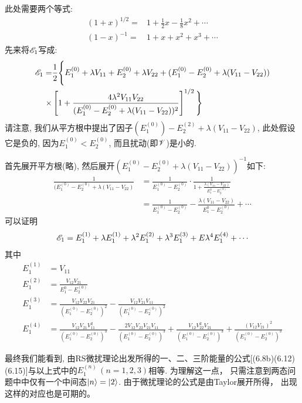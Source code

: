 此处需要两个等式:
\begin{align}
	(1+x)^{1/2} =& 1 + \frac{1}{2} x - \frac{1}{8} x^2 + \cdots\\
	(1-x)^{-1}  =& 1 +x +x^2 +x^3+\cdots
\end{align}
先来将$\mathscr{E}_1$写成:
\begin{align*}
\mathscr{E}_1 = & \frac{1}{2} \Bigg\{ E_1^{(0)} + \lambda V_{11} + E_2^{(0)} + \lambda V_{22} + (E_1^{(0)} -E_2^{(0)} +\lambda(V_{11} - V_{22}) ) \\
\times & \left[1 + \frac{4\lambda^2V_{11}V_{22}}{(E_1^{(0)}  - E_2^{(0)} + \lambda(V_{11}-V_{22}) )^2} \right]^{1/2}
     \Bigg\}
\end{align*}
请注意, 
我们从平方根中提出了因子$(E_1^{(0)}) - E_2^{(2)} +\lambda(V_{11}-V_{22}) $, 
此处假设它是负的, 
因为$E_1^{(0)}<E_2^{(0)}$, 
而且扰动(即$\mathscr{V}$)是小的.


首先展开平方根(略), 
然后展开$(E_1^{(0)}-E_2^{(0)} + \lambda(V_{11}-V_{22}))^{-1}$如下:
\begin{align*}
	\frac{1}{(E_1^{(0)}-E_2^{(0)} + \lambda(V_{11}-V_{22})} & =\frac{1}{E_1^{(0)} - E_2^{(0) }}\cdot \frac{1}{1+\frac{\lambda(V_{11}-V_{22}) }{E_1^{0} -E_2^{(0)} }}\\
		& = \frac{1}{E_1^{(0)} - E_2^{(0)}} - \frac{\lambda(V_{11}-V_{22}) }{E_1^{0} -E_2^{(0)} }+\cdots
\end{align*}
可以证明
\begin{align}
\mathscr{E}_1 = E_1^{(1)} + \lambda E_1^{(1)} + \lambda^2 E_1^{(2)} + \lambda^3 E_1^{(3)} + E\lambda^4 E_1^{(4)} + \cdots
\end{align}
其中
\begin{subequations}
	\begin{align}
	E_1^{(1)} &= V_{11} \\
	E_1^{(2)} &= \frac{V_{12}V_{21}}{E_1^{0} - E_2^{(0)}} \\
	E_1^{(3)} &= \frac{V_{12} V_{22} V_{21} }{(E_1^{(0)} - E_2^{(0)})^2} - \frac{V_{12} V_{21} V_{11} }{ (E_1^{(0)} - E_2^{(0)})^2 }\\
	E_1^{(4)} &= \frac{V_{12} V_{21} V_{11}^2 }{(E_1^{(0)} - E_2^{(0)})^3} - \frac{2 V_{12} V_{22} V_{21} V_{11} }{(E_1^{(0)} - E_2^{(0)})^3} + \frac{V_{12} V_{22}^2 V_{21} }{(E_1^{(0)} - E_2^{(0)})^3} + \frac{ (V_{12} V_{21})^2 }{(E_1^{(0)} - E_2^{(0)})^3}
	\end{align}
\end{subequations}

最终我们能看到,
由RS微扰理论出发所得的一、二、三阶能量的公式[(6.8b)(6.12)(6.15)]与以上式中的$E_1^{(n)}\,(n=1,2,3)$相等. 
为理解这一点，
只需注意到两态问题中中仅有一个中间态$\Ket{n} = \Ket{2}$. 
由于微扰理论的公式是由Taylor展开所得，
出现这样的对应也是可期的。



